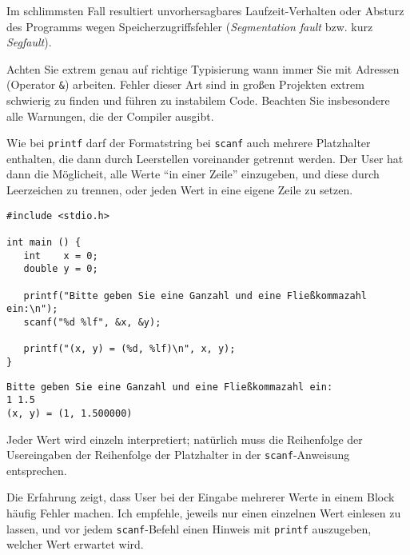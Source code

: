 Im schlimmsten Fall resultiert unvorhersagbares Laufzeit-Verhalten oder Absturz des Programms wegen Speicherzugriffsfehler (\emph{Segmentation fault} bzw. kurz \emph{Segfault}).

\begin{warnbox}[Typisierung]
Achten Sie extrem genau auf richtige Typisierung wann immer Sie mit Adressen (Operator \texttt{\&}) arbeiten. Fehler dieser Art sind in großen Projekten extrem schwierig zu finden und führen zu instabilem Code. Beachten Sie insbesondere alle Warnungen, die der Compiler ausgibt.
\end{warnbox}

Wie bei \texttt{printf} darf der Formatstring bei \texttt{scanf} auch mehrere Platzhalter enthalten, die dann durch Leerstellen voreinander getrennt werden. Der User hat dann die Möglicheit, alle Werte \enquote{in einer Zeile} einzugeben, und diese durch Leerzeichen zu trennen, oder jeden Wert in eine eigene Zeile zu setzen.

\begin{codebox}
\begin{verbatim}
#include <stdio.h>

int main () {
   int    x = 0;
   double y = 0;

   printf("Bitte geben Sie eine Ganzahl und eine Fließkommazahl ein:\n");
   scanf("%d %lf", &x, &y);

   printf("(x, y) = (%d, %lf)\n", x, y);
}
\end{verbatim}
\end{codebox}

\begin{cmdbox}
\begin{verbatim}
Bitte geben Sie eine Ganzahl und eine Fließkommazahl ein:
1 1.5
(x, y) = (1, 1.500000)
\end{verbatim}
\end{cmdbox}

Jeder Wert wird einzeln interpretiert; natürlich muss die Reihenfolge der Usereingaben der Reihenfolge der Platzhalter in der \texttt{scanf}-Anweisung entsprechen.

\begin{hintbox}
Die Erfahrung zeigt, dass User bei der Eingabe mehrerer Werte in einem Block häufig Fehler machen. Ich empfehle, jeweils nur einen einzelnen Wert einlesen zu lassen, und vor jedem \texttt{scanf}-Befehl einen Hinweis mit \texttt{printf} auszugeben, welcher Wert erwartet wird.
\end{hintbox}

